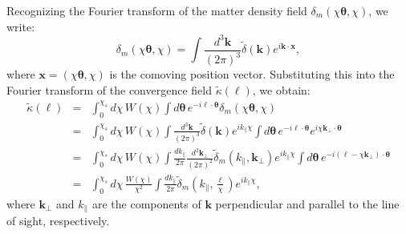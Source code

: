 Recognizing the Fourier transform of the matter density field \( \delta_m\left(\chi \boldsymbol{\theta}, \chi\right) \), we write:
\begin{equation}
    \delta_m\left(\chi \boldsymbol{\theta}, \chi\right) = \int \frac{d^3\mathbf{k}}{(2\pi)^3} \tilde{\delta}(\mathbf{k}) e^{i \mathbf{k} \cdot \mathbf{x}},
    \label{eq:delta_m_fourier}
\end{equation}
where \( \mathbf{x} = (\chi \boldsymbol{\theta}, \chi) \) is the comoving position vector. Substituting this into the Fourier transform of the convergence field \( \tilde{\kappa}(\boldsymbol{\ell}) \), we obtain:
\begin{eqnarray}
    \tilde{\kappa}(\boldsymbol{\ell}) &=& \int_0^{\chi_s} d\chi \, W(\chi) \int d\boldsymbol{\theta} \, e^{-i \boldsymbol{\ell} \cdot \boldsymbol{\theta}} \delta_m\left(\chi \boldsymbol{\theta}, \chi\right) \nonumber \\
    &=& \int_0^{\chi_s} d\chi \, W(\chi) \int \frac{d^3\mathbf{k}}{(2\pi)^3} \tilde{\delta}(\mathbf{k}) e^{i k_\parallel \chi} \int d\boldsymbol{\theta} \, e^{-i \boldsymbol{\ell} \cdot \boldsymbol{\theta}} e^{i \chi \mathbf{k}_\perp \cdot \boldsymbol{\theta}} \nonumber \\
    &=& \int_0^{\chi_s} d\chi \, W(\chi) \int \frac{dk_\parallel}{2\pi} \frac{d^2\mathbf{k}_\perp}{(2\pi)^2} \tilde{\delta}_m(k_\parallel, \mathbf{k}_\perp) e^{i k_\parallel \chi} \int d\boldsymbol{\theta} \, e^{-i (\boldsymbol{\ell} - \chi \mathbf{k}_\perp) \cdot \boldsymbol{\theta}} \nonumber \\
    &=& \int_0^{\chi_s} d\chi \, \frac{W(\chi)}{\chi^2} \int \frac{dk_\parallel}{2\pi} \tilde{\delta}_m\left(k_\parallel, \frac{\boldsymbol{\ell}}{\chi}\right) e^{i k_\parallel \chi},
    \label{eq:kappa_fourier_final}
\end{eqnarray}
where \( \mathbf{k}_\perp \) and \( k_\parallel \) are the components of \( \mathbf{k} \) perpendicular and parallel to the line of sight, respectively.

